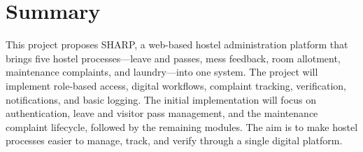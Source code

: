 \documentclass[11pt,a4paper]{article}
\begin{document}
\section{Summary}
This project proposes SHARP, a web-based hostel administration platform that brings five hostel processes—leave and passes, mess feedback, room allotment, maintenance complaints, and laundry—into one system. The project will implement role-based access, digital workflows, complaint tracking, verification, notifications, and basic logging. The initial implementation will focus on authentication, leave and visitor pass management, and the maintenance complaint lifecycle, followed by the remaining modules. The aim is to make hostel processes easier to manage, track, and verify through a single digital platform.
\end{document}
